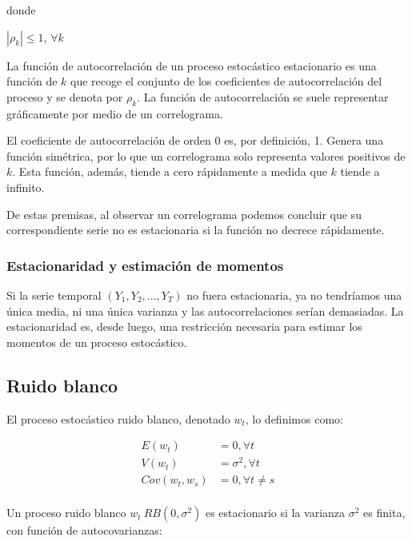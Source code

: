 \documentclass[a4paper,10pt]{article}
\begin{document}
donde

\begin{center}
$|\rho_k| \leq 1$, $\forall k$
\end{center}

La función de autocorrelación de un proceso estocástico estacionario es una función de $k$ que
recoge el conjunto de los coeficientes de autocorrelación del proceso y se denota por $\rho_k$. La función de autocorrelación se suele representar gráficamente por medio de un correlograma.

El coeficiente de autocorrelación de orden 0 es, por definición, 1. Genera una función simétrica, por lo que un correlograma solo representa valores positivos de $k$. Esta función, además, tiende a cero rápidamente a medida que $k$ tiende a infinito.

De estas premisas, al observar un correlograma podemos concluir que su correspondiente serie no es estacionaria si la función no decrece rápidamente.

\subsubsection{Estacionaridad y estimación de momentos}

Si la serie temporal $(Y_1,Y_2,...,Y_T)$ no fuera estacionaria, ya no tendríamos una única media, ni una única varianza y las autocorrelaciones serían demasiadas. La estacionaridad es, desde luego, una restricción necesaria para estimar los momentos de un proceso estocástico.

\subsection{Ruido blanco}

El proceso estocástico ruido blanco, denotado $w_t$, lo definimos como:

\begin{equation*}
\begin{split}
E(w_t) &= 0, \forall t \\
V(w_t) &= \sigma^2, \forall t \\
Cov(w_t,w_s) &= 0, \forall t \neq s \\
\end{split}
\end{equation*}

Un proceso ruido blanco $w_t ~ RB(0,\sigma^2)$ es estacionario si la varianza $\sigma^2$ es finita, con función de autocovarianzas:
\end{document}
